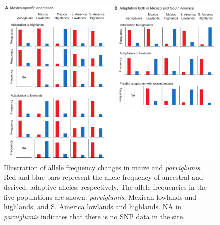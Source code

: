 \begin{figure}[b]
  \begin{center}
    \includegraphics[width=0.9\columnwidth]{fig/AllelePat.pdf}
    \caption{Illustration of allele frequency changes in maize and \emph{parviglumis}.  Red and blue bars represent the allele frequency of ancestral and derived, adaptive alleles, respectively.  The allele frequencies in the five populations are shown: \emph{parviglumis}, Mexican lowlands and highlands, and S. America lowlands and highlands. NA in \emph{parviglumis} indicates that there is no SNP data in the site.}
    \label{AllelePat}
  \end{center}
\end{figure}

\clearpage
\suppl




\renewcommand{\arraystretch}{1.2}

